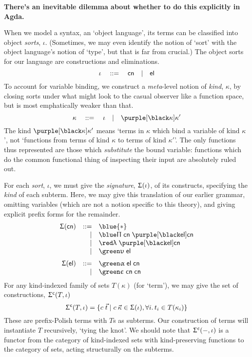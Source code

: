 \documentclass[natbib]{article}
\newcommand{\type}{\blue{\ast}}
\begin{document}
\textbf{There's an inevitable dilemma about whether to do this explicitly in Agda.}

When we model a syntax, an `object language', its terms can be classified into object \emph{sorts}, $\iota$. (Sometimes, we may even identify the notion of `sort' with the object language's notion of `type', but that is far from crucial.) The object sorts for our language are constructions and eliminations.
\[
  \iota \quad::=\quad \mathsf{cn} \quad|\quad \mathsf{el}
\]
To account for variable binding, we construct a \emph{meta}-level notion of \emph{kind}, $\kappa$, by closing sorts under what might look to the casual observer like a function space, but is most emphatically weaker than that.
\[
  \kappa \quad::=\quad \iota \quad|\quad \bnd\kappa \kappa'
\]
The kind $\bnd\kappa \kappa'$ means `terms in $\kappa$ which bind a variable of kind $\kappa$', not `functions from terms of kind $\kappa$ to terms of kind $\kappa'$'. The only functions thus represented are those which
\emph{substitute} the bound variable: functions which do the common functional thing of inspecting their input are absolutely ruled out.

\newcommand{\Sg}{\Upsigma}
For each \emph{sort}, $\iota$, we must give the \emph{signature}, $\Sg(\iota)$, of its constructs, specifying the \emph{kind} of each subterm. Here, we may give this translation of our earlier grammar, omitting variables (which are not a notion specific to this theory), and giving explicit prefix forms for the remainder.
\[\begin{array}{rrl}
\Sg(\cns) & ::= & \type \\
          &   | & \pic\; \cns\; \bnd\elm\cns \\
          &   | & \lac\; \bnd\elm\cns \\
          &   | & \elc\;\elm \medskip \\
\Sg(\elm) & ::= & \apc\;\elm\;\cns \\
          &   | & \tyc\;\cns\;\cns
\end{array}\]
\newcommand{\Sgc}[2]{\Sg^{\mathsf{c}}(#1,#2)}
For any kind-indexed family of sets $T(\kappa)$ (for `term'), we may give the set of constructions, $\Sgc T\iota$
\[
  \Sgc T\iota = \{c\;\vec{t} \;|\; c\:\vec{\kappa}\in \Sg(\iota), \forall i.\,t_i\in T(\kappa_i)\}
\]
These are prefix-Polish terms with $T$s as subterms. Our construction of terms will instantiate $T$ recursively,
`tying the knot'. We should note that $\Sgc-\iota$ is a functor from the category of kind-indexed sets with kind-preserving
functions to the category of sets, acting structurally on the subterms.
\end{document}
